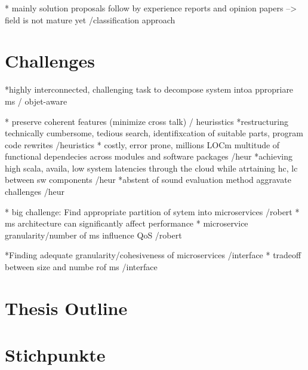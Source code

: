 * mainly solution proposals follow by experience reports and opinion papers --> field is not mature yet /classification approach

\section{Challenges}
\label{sec:Introduction:Challenges}

*highly interconnected, challenging task to decompose system intoa ppropriare ms / objet-aware

* preserve coherent features (minimize cross talk) / heurisstics
*restructuring technically cumbersome, tedious search, identifixcation of suitable parts, program code rewrites /heuristics
* costly, error prone, millions LOCm multitude of functional dependecies across modules and software packages /heur
*achieving high scala, availa, low system latencies through the cloud while atrtaining hc, lc between sw  components /heur
*abstent of sound evaluation method aggravate challenges /heur

* big challenge: Find appropriate partition of sytem into microservices /robert
* ms architecture can significantly affect performance
* microservice granularity/number of ms influence QoS /robert

*Finding adequate granularity/cohesiveness of microservices /interface
* tradeoff between size and numbe rof ms /interface


\section{Thesis Outline}
\label{sec_Introduction:ThesisOutline}













\section{Stichpunkte}

